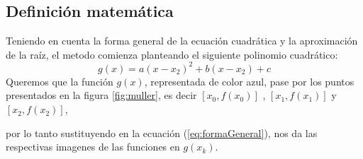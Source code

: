 \documentclass[ceqn,10pt]{SelfArx}
\begin{document}
\subsection{Definición matemática}

Teniendo en cuenta la forma general de la ecuación cuadrática y la aproximación de la raíz,
el metodo comienza planteando el siguiente polinomio cuadrático:
\begin{equation} \label{eq:formaGeneral}
	g(x)=a(x-x_{2})^2+b(x-x_{2})+c
\end{equation}
Queremos que la función $g(x)$, representada de color azul, 
pase por los puntos presentados en la figura \ref*{fig:muller},
es decir $[x_{0},f(x_{0})]$ , $[x_{1},f(x_{1})]$ y $[x_{2},f(x_{2})]$,

por lo tanto sustituyendo en la ecuación (\ref*{eq:formaGeneral}),
nos da las respectivas imagenes de las funciones en $g(x_{k})$.
\end{document}
